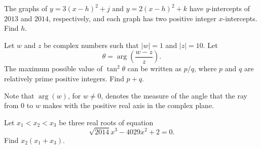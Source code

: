 \documentclass[11pt]{article}
\theoremstyle{definition}
\begin{document}
\begin{question}[name={2014 AIME I, \href{https://artofproblemsolving.com/community/c4p3428736}{Problem 6}}]
	The graphs of $y=3(x-h)^2+j$ and $y=2(x-h)^2+k$ have $y$-intercepts of $2013$ and $2014$, respectively, and each graph has two positive integer $x$-intercepts. Find $h$.	
	
\end{question}


%	












\begin{question}[name={2014 AIME I, \href{https://artofproblemsolving.com/community/c4p3428814}{Problem 7}}]
	Let $w$ and $z$ be complex numbers such that $|w| = 1$ and $|z| = 10$. Let $$\theta = \arg\left(\frac{w-z}{z}\right).$$ The maximum possible value of $\tan^2 \theta$ can be written as ${p}/{q}$, where $p$ and $q$ are relatively prime positive integers. Find $p+q$. 
	
	Note that $\arg(w)$, for $w \neq 0$, denotes the measure of the angle that the ray from $0$ to $w$ makes with the positive real axis in the complex plane.
\end{question}


%	










\begin{question}[name={2014 AIME I, \href{https://artofproblemsolving.com/community/c4p3428727}{Problem 9}}]
	Let $x_1<x_2<x_3$ be three real roots of equation $$\sqrt{2014}x^3-4029x^2+2=0.$$ Find $x_2(x_1+x_3)$.
\end{question}


%	
\end{document}
